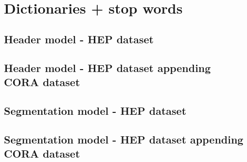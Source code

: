\documentclass[11pt, oneside]{scrartcl}   	%
\begin{document}
\section{Dictionaries + stop words}
\subsection{Header model - HEP dataset}
\subsection{Header model - HEP dataset appending CORA dataset}
\subsection{Segmentation model - HEP dataset}
\subsection{Segmentation model - HEP dataset appending CORA dataset}

\end{document}
